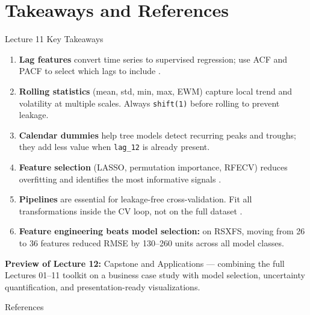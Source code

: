 \documentclass[aspectratio=169, 10pt]{beamer}
\begin{document}
\section{Takeaways and References}


\begin{frame}{Lecture 11 Key Takeaways}
  \begin{keybox}
    \footnotesize
    \begin{enumerate}\setlength{\itemsep}{1pt}
      \item \textbf{Lag features} convert time series to supervised
            regression; use ACF and PACF to select which lags to
            include \parencite{BoxJenkins2015}.
      \item \textbf{Rolling statistics} (mean, std, min, max, EWM)
            capture local trend and volatility at multiple scales.
            Always \texttt{shift(1)} before rolling to prevent
            leakage.
      \item \textbf{Calendar dummies} help tree models detect
            recurring peaks and troughs; they add less value when
            \texttt{lag\_12} is already present.
      \item \textbf{Feature selection} (LASSO, permutation
            importance, RFECV) reduces overfitting and identifies
            the most informative signals
            \parencite{Guyon2003,Molnar2022}.
      \item \textbf{Pipelines} are essential for leakage-free
            cross-validation. Fit all transformations inside the
            CV loop, not on the full dataset
            \parencite{Pedregosa2011}.
      \item \textbf{Feature engineering beats model selection:}
            on RSXFS, moving from 26 to 36 features reduced RMSE
            by 130--260 units across all model classes.
    \end{enumerate}
  \end{keybox}

  \smallskip
  \textbf{Preview of Lecture 12:} Capstone and Applications ---
  combining the full Lectures 01--11 toolkit on a business
  case study with model selection, uncertainty quantification,
  and presentation-ready visualizations.
\end{frame}

\begin{frame}{References}
  \printbibliography[heading=none]
\end{frame}

\end{document}
